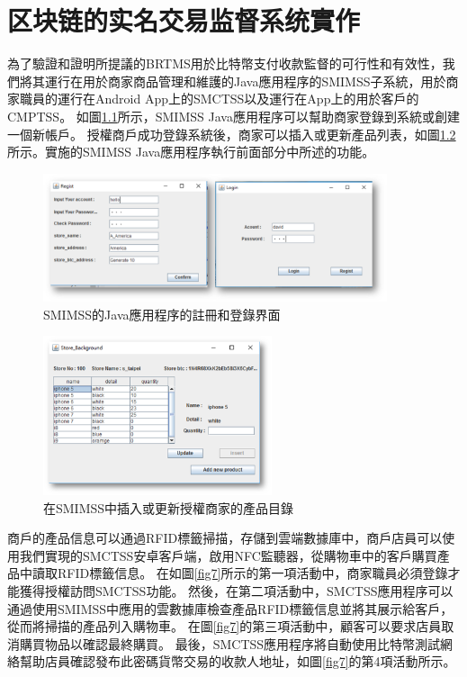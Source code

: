 
\chapter{区块链的实名交易监督系统實作}

為了驗證和證明所提議的BRTMS用於比特幣支付收款監督的可行性和有效性，我們將其運行在用於商家商品管理和維護的Java應用程序的SMIMSS子系統，用於商家職員的運行在Android App上的SMCTSS以及運行在App上的用於客戶的CMPTSS。
如圖\ref{fig5}所示，SMIMSS Java應用程序可以幫助商家登錄到系統或創建一個新帳戶。 授權商戶成功登錄系統後，商家可以插入或更新產品列表，如圖\ref{fig6}所示。實施的SMIMSS Java應用程序執行前面部分中所述的功能。

\begin{figure}[h]
	\centering
	\includegraphics[width = 0.9\textwidth]{fig5.png}
	\caption{SMIMSS的Java應用程序的註冊和登錄界面}\label{fig5}
\end{figure}

\begin{figure}[h]
	\centering
	\includegraphics[width = 0.6\textwidth]{fig6.png}
	\caption{在SMIMSS中插入或更新授權商家的產品目錄}\label{fig6}
\end{figure}

商戶的產品信息可以通過RFID標籤掃描，存儲到雲端數據庫中，商戶店員可以使用我們實現的SMCTSS安卓客戶端，啟用NFC監聽器，從購物車中的客戶購買產品中讀取RFID標籤信息。 在如圖\ref{fig7}所示的第一項活動中，商家職員必須登錄才能獲得授權訪問SMCTSS功能。 然後，在第二項活動中，SMCTSS應用程序可以通過使用SMIMSS中應用的雲數據庫檢查產品RFID標籤信息並將其展示給客戶，從而將掃描的產品列入購物車。 在圖\ref{fig7}的第三項活動中，顧客可以要求店員取消購買物品以確認最終購買。 最後，SMCTSS應用程序將自動使用比特幣測試網絡幫助店員確認發布此密碼貨幣交易的收款人地址，如圖\ref{fig7}的第4項活動所示。    

